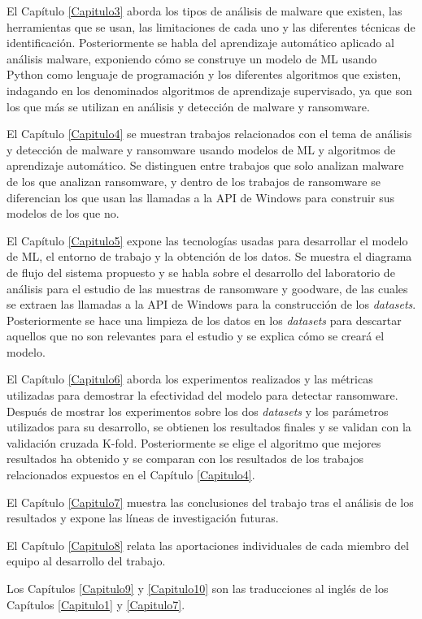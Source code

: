 El Capítulo \ref{Capitulo3} aborda los tipos de análisis de malware que existen, las herramientas que se usan, las limitaciones de cada uno y las diferentes técnicas de identificación. Posteriormente se habla del aprendizaje automático aplicado al análisis malware, exponiendo cómo se construye un modelo de \gls{ML} usando Python como lenguaje de programación y los diferentes algoritmos que existen, indagando en los denominados algoritmos de aprendizaje supervisado, ya que son los que más se utilizan en análisis y detección de malware y ransomware.

El Capítulo \ref{Capitulo4} se muestran trabajos relacionados con el tema de análisis y detección de malware y ransomware usando modelos de \gls{ML} y algoritmos de aprendizaje automático. Se distinguen entre trabajos que solo analizan malware de los que analizan ransomware, y dentro de los trabajos de ransomware se diferencian los que usan las llamadas a la \gls{API} de Windows para construir sus modelos de los que no.

El Capítulo \ref{Capitulo5} expone las tecnologías usadas para desarrollar el modelo de \gls{ML}, el entorno de trabajo y la obtención de los datos. Se muestra el diagrama de flujo del sistema propuesto y se habla sobre el desarrollo del laboratorio de análisis para el estudio de las muestras de ransomware y goodware, de las cuales se extraen las llamadas a la \gls{API} de Windows para la construcción de los \textit{datasets}. Posteriormente se hace una limpieza de los datos en los \textit{datasets} para descartar aquellos que no son relevantes para el estudio y se explica cómo se creará el modelo.

El Capítulo \ref{Capitulo6} aborda los experimentos realizados y las métricas utilizadas para demostrar la efectividad del modelo para detectar ransomware. Después de mostrar los experimentos sobre los dos \textit{datasets} y los parámetros utilizados para su desarrollo, se obtienen los resultados finales y se validan con la validación cruzada K-fold. Posteriormente se elige el algoritmo que mejores resultados ha obtenido y se comparan con los resultados de los trabajos relacionados expuestos en el Capítulo \ref{Capitulo4}.

El Capítulo \ref{Capitulo7} muestra las conclusiones del trabajo tras el análisis de los resultados y expone las líneas de investigación futuras.

El Capítulo \ref{Capitulo8} relata las aportaciones individuales de cada miembro del equipo al desarrollo del trabajo.

Los Capítulos \ref{Capitulo9} y \ref{Capitulo10} son las traducciones al inglés de los Capítulos \ref{Capitulo1} y \ref{Capitulo7}.